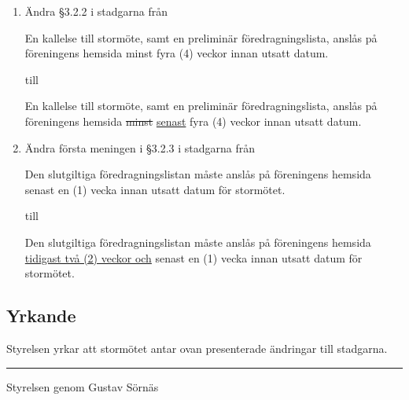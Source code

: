 \documentclass[12pt,a4paper]{article}
\newenvironment{quotationb}%
{\begin{leftbar}}%
{\end{leftbar}}
\begin{document}
\begin{enumerate}
    \item Ändra \S{}3.2.2 i stadgarna från 

    \begin{quotationb}
        En kallelse till stormöte, samt en preliminär föredragningslista, anslås
        på föreningens hemsida minst fyra (4) veckor innan utsatt datum.
    \end{quotationb}

    till

    \begin{quotationb}
        En kallelse till stormöte, samt en preliminär föredragningslista, anslås
        på föreningens hemsida \sout{minst} \underline{senast} fyra (4) veckor
        innan utsatt datum.
    \end{quotationb}

    \item Ändra första meningen i \S{}3.2.3 i stadgarna från

    \begin{quotationb}
        Den slutgiltiga föredragningslistan måste anslås på föreningens hemsida
        senast en (1) vecka innan utsatt datum för stormötet.
    \end{quotationb}

    till 

    \begin{quotationb}
        Den slutgiltiga föredragningslistan måste anslås på föreningens hemsida
        \underline{tidigast två (2) veckor och} senast en (1) vecka innan utsatt datum för stormötet.
    \end{quotationb}

\end{enumerate}

\subsection{Yrkande}


Styrelsen yrkar att stormötet antar ovan presenterade ändringar till stadgarna.

\noindent\rule{\linewidth}{1pt}

Styrelsen genom Gustav Sörnäs
\end{document}
